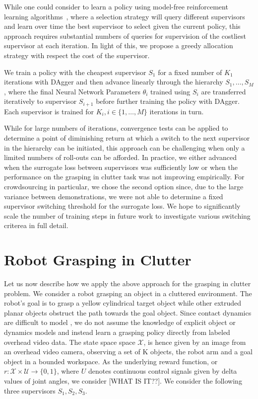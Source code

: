 \documentclass[10pt, conference]{ieeeconf}      %
\begin{document}
While one could consider to learn a policy using model-free reinforcement learning algorithms~\cite{sutton1998reinforcement}, where a selection strategy will query different supervisors and learn over time the
best supervisor to select given the current policy, this approach requires substantial numbers of 
queries for supervision of the costliest supervisor at each iteration. In light of this, we propose a greedy allocation
strategy with respect the cost of the supervisor.

We train a policy with the cheapest supervisor $S_1$ for a fixed number of $K_1$ iterations with DAgger and then advance
linearly through the hierarchy $S_1, \ldots, S_M$, where the final Neural Network Parameters $\theta_i$ trained using
$S_i$ are transferred iteratively to supervisor $S_{i+1}$ before further training the policy with DAgger.
Each supervisor is trained for $K_i, i\in \{1, \ldots, M\}$ iterations in turn. 

While for large numbers of iterations, convergence tests can be applied to determine a point of diminishing return at
which a switch to the next supervisor in the hierarchy can be initiated, this approach can be challenging when only a
limited numbers of roll-outs can be afforded. In practice, we either advanced when the surrogate loss between
supervisors was sufficiently low or when the performance on the grasping in clutter task was not improving empirically. 
For crowdsourcing in particular, we chose the second option since, due to the large variance between demonstrations,
we were not able to determine a fixed supervisor switching threshold for the surrogate loss. We hope to significantly scale the number of
training steps in future work to investigate various switching criterea in full detail.




\section{Robot Grasping in Clutter}
Let us now describe how we apply the above approach for the grasping in clutter problem. We consider a robot grasping an
object in a cluttered environment. The robot's goal is to grasp a yellow cylindrical target object while other extruded
planar objects obstruct the path towards the goal object. Since contact dynamics are difficult to model \cite{kitaevphysics,kingnonprehensile}, we do not assume the knowledge of explicit object or dynamics models and instead learn a grasping policy directly from labeled
overhead video data. The state space space $\mathcal{X}$, is hence given by an image from an overhead video
camera, observing a set of K objects, the robot arm and a goal object in a bounded workspace. As the underlying reward
function, or $r: \mathcal{X}\times \mathcal{U} \rightarrow \lbrace 0, 1\rbrace$, where $U$ denotes continuous control
signals given by delta values of joint angles, we consider {\color{blue} [WHAT IS IT??]}. We consider the following three supervisors $S_1, S_2, S_3$.
\end{document}
